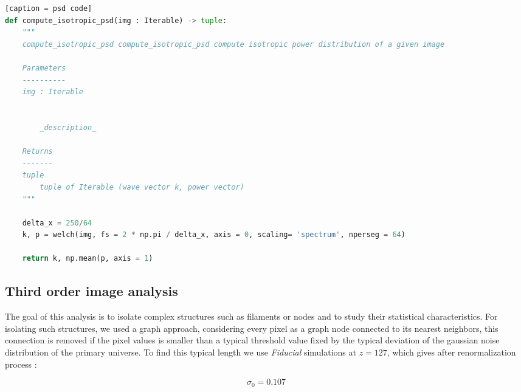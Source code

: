 \documentclass[11pt,a4paper]{report}
\begin{document}
\begin{multicols*}{2}
    \begin{lstlisting}[language=Python][caption = psd code]
def compute_isotropic_psd(img : Iterable) -> tuple: 
    """
    compute_isotropic_psd compute_isotropic_psd compute isotropic power distribution of a given image

    Parameters
    ----------
    img : Iterable


        _description_

    Returns
    -------
    tuple
        tuple of Iterable (wave vector k, power vector)
    """    
    
    delta_x = 250/64
    k, p = welch(img, fs = 2 * np.pi / delta_x, axis = 0, scaling= 'spectrum', nperseg = 64)
    
    return k, np.mean(p, axis = 1)
    \end{lstlisting}

    \subsection{Third order image analysis}

    The goal of this analysis is to isolate complex structures such as filaments or nodes and to study their statistical characteristics.
    For isolating such structures, we used a graph approach, considering every pixel as a graph node connected to its nearest neighbors, this connection is removed if the pixel values is  smaller than a typical threshold value fixed by the typical deviation of the gaussian noise distribution of the primary universe.
    To find this typical length we use \emph{Fiducial} simulations at $z = 127$, which gives after renormalization process :

    $$\sigma_0 = 0.107$$



\end{multicols*}
\end{document}

